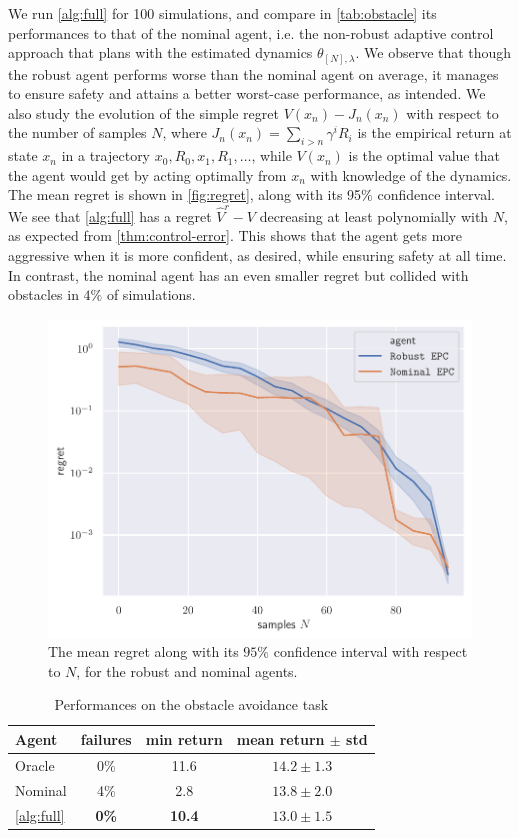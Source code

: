 We run \autoref{alg:full} for 100 simulations, and compare in \autoref{tab:obstacle} its performances to that of the nominal agent, i.e. the non-robust adaptive control approach that plans with the estimated dynamics $\theta_{[N],\lambda}$. We observe that though the robust agent performs worse than the nominal agent on average, it manages to ensure safety and attains a better worst-case performance, as intended. We also study the evolution of the simple regret $V(x_n) - J_n(x_n)$ with respect to the number of samples $N$, where $J_n(x_n) = \sum_{i > n} \gamma^i R_i$ is the empirical return at state $x_n$ in a trajectory $x_0, R_0, x_1, R_1, \dots$, while $V(x_n)$ is the optimal value that the agent would get by acting optimally from $x_n$ with knowledge of the dynamics. The mean regret is shown in \autoref{fig:regret}, along with its 95\% confidence interval. We see that \autoref{alg:full} has a regret $\hat{V}^r - V$ decreasing at least polynomially with $N$, as expected from \autoref{thm:control-error}. This shows that the agent gets more aggressive when it is more confident, as desired, while ensuring safety at all time. In contrast, the nominal agent has an even smaller regret but collided with obstacles in $4\%$ of simulations.

\begin{figure}[tp]
	\centering
	\includegraphics[width=0.8\linewidth]{img/regret.pdf}
	\caption{The mean regret along with its $95\%$ confidence interval with respect to $N$, for the robust and nominal agents.}
	\label{fig:regret}
\end{figure}

\begin{table}[tbp]
	\caption{Performances on the obstacle avoidance task}
	\label{tab:obstacle}
	\centering
	\begin{tabular}{lccc}
		\toprule
		Agent &
		failures &
		min return &
		mean return $\pm$ std  \\
		\midrule
		Oracle & 0\% & {11.6} & {$14.2 \pm 1.3$} \\
		\midrule
		{Nominal} & {4\%} & {2.8} & \textbf{$\mathbf{13.8} \pm 2.0$} \\
		\autoref{alg:full} & \textbf{0\%} & \textbf{10.4} & {$13.0 \pm 1.5$} \\
		\bottomrule
	\end{tabular}
\end{table}

